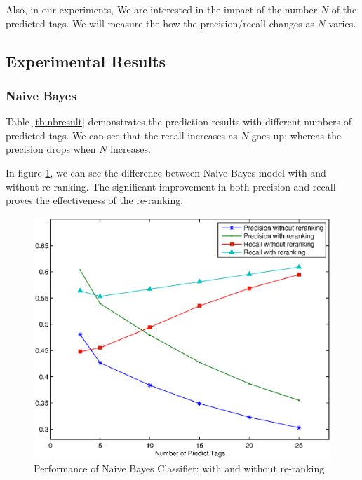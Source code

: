Also, in our experiments, We are interested in the impact of the number $N$ of the predicted tags. We will measure the how the precision/recall changes as $N$ varies.

\subsection{Experimental Results}
\subsubsection{Naive Bayes}
Table \ref{tb:nbresult} demonstrates the prediction results with different numbers of predicted tags. We can see that the recall increases as $N$ goes up; whereas the precision drops when $N$ increases.

In figure \ref{fig:naive}, we can see the difference between Naive Bayes model with and without re-ranking. The significant improvement in both precision and recall proves the effectiveness of the re-ranking.

\begin{figure}[htb!]
\centering%
    \includegraphics[scale=0.60]{pic/nb_result.eps}
\caption{Performance of Naive Bayes Classifier: with and without re-ranking}
\label{fig:naive}
\end{figure}

